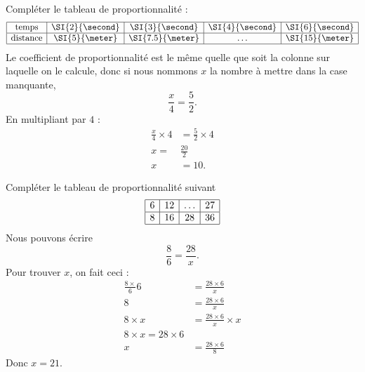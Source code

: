 \begin{example}
    Compléter le tableau de proportionnalité :
    \begin{equation*}
        \begin{array}[]{|c|c|c|c|c|}
            \hline
            \text{temps}&\SI{2}{\second}&\SI{3}{\second}&\SI{4}{\second}&\SI{6}{\second}\\
            \hline
            \text{distance}&\SI{5}{\meter}&\SI{7.5}{\meter}&\ldots&\SI{15}{\meter}\\
            \hline
        \end{array}
    \end{equation*}
    Le coefficient de proportionnalité est le même quelle que soit la colonne sur laquelle on le calcule, donc si nous nommons \( x\) la nombre à mettre dans la case manquante,
    \begin{equation}
        \frac{ x }{ 4 }=\frac{ 5 }{ 2 }.
    \end{equation}
    En multipliant par \( 4\) :
    \begin{subequations}
        \begin{align}
            \frac{ x }{ 4 }\times 4&=\frac{ 5 }{ 2 }\times 4\\
            x=&\frac{ 20 }{ 2 }\\
            x&=10.
        \end{align}
    \end{subequations}
\end{example}

\begin{example}
    Compléter le tableau de proportionnalité suivant
    \begin{equation*}
        \begin{array}[]{|c|c|c|c|}
            \hline
             6&12&\ldots&27\\
              \hline
              8&16&28&36\\ 
              \hline 
               \end{array}
    \end{equation*}
    Nous pouvons écrire
    \begin{equation}
        \frac{ 8 }{ 6 }=\frac{ 28 }{ x }.
    \end{equation}
    Pour trouver \( x\), on fait ceci :
    \begin{subequations}
        \begin{align}
            \frac{ 8\times }{ 6 } 6&=\frac{ 28\times 6 }{ x }\\
            8&=\frac{ 28\times 6 }{ x }\\
            8\times x&=\frac{ 28\times 6 }{ x }\times x\\
            8\times x=28\times 6\\
            x&=\frac{ 28\times 6 }{ 8 }
        \end{align}
    \end{subequations}
    Donc \( x=21\).
\end{example}

